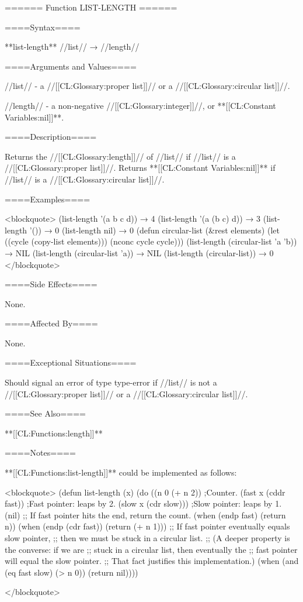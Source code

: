 ====== Function LIST-LENGTH ======

====Syntax====

**list-length** //list// → //length//

====Arguments and Values====

//list// - a //[[CL:Glossary:proper list]]// or a //[[CL:Glossary:circular list]]//.

//length// - a non-negative //[[CL:Glossary:integer]]//, or **[[CL:Constant Variables:nil]]**.

====Description====

Returns the //[[CL:Glossary:length]]// of //list// if //list// is a //[[CL:Glossary:proper list]]//. Returns **[[CL:Constant Variables:nil]]** if //list// is a //[[CL:Glossary:circular list]]//.

====Examples====

<blockquote> (list-length '(a b c d)) → 4 (list-length '(a (b c) d)) → 3 (list-length '()) → 0 (list-length nil) → 0 (defun circular-list (&rest elements) (let ((cycle (copy-list elements))) (nconc cycle cycle))) (list-length (circular-list 'a 'b)) → NIL (list-length (circular-list 'a)) → NIL (list-length (circular-list)) → 0 </blockquote>

====Side Effects====

None.

====Affected By====

None.

====Exceptional Situations====

Should signal an error of type type-error if //list// is not a //[[CL:Glossary:proper list]]// or a //[[CL:Glossary:circular list]]//.

====See Also====

**[[CL:Functions:length]]**

====Notes====

**[[CL:Functions:list-length]]** could be implemented as follows:

<blockquote> (defun list-length (x) (do ((n 0 (+ n 2)) ;Counter. (fast x (cddr fast)) ;Fast pointer: leaps by 2. (slow x (cdr slow))) ;Slow pointer: leaps by 1. (nil) ;; If fast pointer hits the end, return the count. (when (endp fast) (return n)) (when (endp (cdr fast)) (return (+ n 1))) ;; If fast pointer eventually equals slow pointer, ;; then we must be stuck in a circular list. ;; (A deeper property is the converse: if we are ;; stuck in a circular list, then eventually the ;; fast pointer will equal the slow pointer. ;; That fact justifies this implementation.) (when (and (eq fast slow) (> n 0)) (return nil))))

</blockquote>

